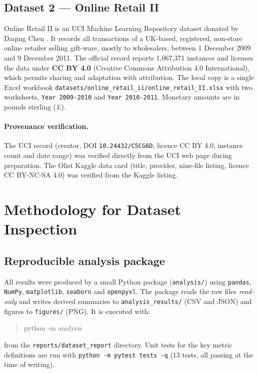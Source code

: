 \documentclass[11pt,a4paper]{article}
\newcommand{\code}[1]{\texttt{#1}}
\begin{document}
\subsection*{Dataset 2 --- Online Retail II}
Online Retail II is an UCI Machine Learning Repository dataset donated by Daqing Chen \cite{chen2012}. It records all transactions of a UK-based, registered, non-store online retailer selling gift-ware, mostly to wholesalers, between 1 December 2009 and 9 December 2011. The official record reports 1{,}067{,}371 instances and licenses the data under \textbf{CC BY 4.0} (Creative Commons Attribution 4.0 International), which permits sharing and adaptation with attribution. The local copy is a single Excel workbook \code{datasets/online\_retail\_ii/online\_retail\_II.xlsx} with two worksheets, \code{Year 2009-2010} and \code{Year 2010-2011}. Monetary amounts are in pounds sterling (\pounds).

\paragraph{Provenance verification.} The UCI record (creator, DOI \code{10.24432/C5CG6D}, licence CC BY 4.0, instance count and date range) was verified directly from the UCI web page during preparation. The Olist Kaggle data card (title, provider, nine-file listing, licence CC BY-NC-SA 4.0) was verified from the Kaggle listing.

\section{Methodology for Dataset Inspection}
\subsection{Reproducible analysis package}
All results were produced by a small Python package (\code{analysis/}) using \code{pandas}, \code{NumPy}, \code{matplotlib}, \code{seaborn} and \code{openpyxl}. The package reads the raw files \emph{read-only} and writes derived summaries to \code{analysis\_results/} (CSV and JSON) and figures to \code{figures/} (PNG). It is executed with:

\begin{quote}\ttfamily
python -m analysis
\end{quote}

\noindent from the \code{reports/dataset\_report} directory. Unit tests for the key metric definitions are run with \code{python -m pytest tests -q} (13 tests, all passing at the time of writing).
\end{document}
